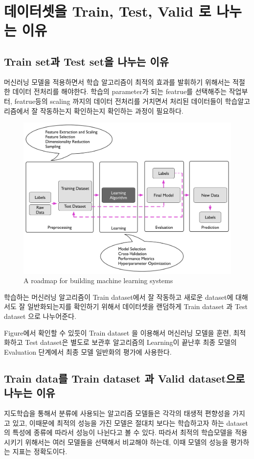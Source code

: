 \section{데이터셋을 Train, Test, Valid 로 나누는 이유}
\subsection{Train set과 Test set을 나누는 이유}
    머신러닝 모델을 적용하면서 학습 알고리즘이 최적의 효과를 발휘하기 위해서는 적절한 데이터 전처리를 해야한다. 학습의 parameter가 되는 featrue를 선택해주는 작업부터, featrue등의 scaling 까지의 데이터 전처리를 거치면서 처리된 데이터들이 학습알고리즘에서 잘 작동하는지 확인하는지 확인하는 과정이 필요하다.\\
    \vspace{-4mm}
    \begin{figure}[!h]\centering
		\includegraphics[width=.65\textwidth]{image/week04/3-1.png}
		\caption{\small A roadmap for building machine learning systems}
		\vspace{-10pt}
    \end{figure}
    
    학습하는 머신러닝 알고리즘이 Train dataset에서 잘 작동하고 새로운 dataset에 대해서도 잘 일반화되는지를 확인하기 위해서 데이터셋을 랜덤하게 Train dataset 과 Test dataset 으로 나누어준다. 

    Figure에서 확인할 수 있듯이 Train dataset 을 이용해서 머신러닝 모델을 훈련, 최적화하고 Test dataset은 별도로 보관후 알고리즘의 Learning이 끝난후 최종 모델의 Evaluation 단계에서 최종 모델 일반화의 평가에 사용한다.
\subsection{Train data를 Train dataset 과 Valid dataset으로 나누는 이유}
    지도학습을 통해서 분류에 사용되는 알고리즘 모델들은 각각의 태생적 편향성을 가지고 있고, 이때문에 최적의 성능을 가진 모델은 절대치 보다는 학습하고자 하는 dataset의 특성에 종류에 따라서 성능이 나뉜다고 볼 수 있다. 따라서 최적의 학습모델을 적용시키기 위해서는 여러 모델들을 선택해서 비교해야 하는데, 이때 모델의 성능을 평가하는 지표는 정확도이다. 

